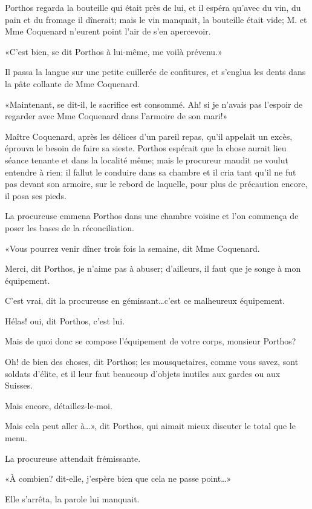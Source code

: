 Porthos regarda la bouteille qui était près de lui, et il espéra qu'avec du vin, du pain et du fromage il dînerait; mais le vin manquait, la bouteille était vide; M. et Mme Coquenard n'eurent point l'air de s'en apercevoir. 

«C'est bien, se dit Porthos à lui-même, me voilà prévenu.» 

Il passa la langue sur une petite cuillerée de confitures, et s'englua les dents dans la pâte collante de Mme Coquenard. 

«Maintenant, se dit-il, le sacrifice est consommé. Ah! si je n'avais pas l'espoir de regarder avec Mme Coquenard dans l'armoire de son mari!» 

Maître Coquenard, après les délices d'un pareil repas, qu'il appelait un excès, éprouva le besoin de faire sa sieste. Porthos espérait que la chose aurait lieu séance tenante et dans la localité même; mais le procureur maudit ne voulut entendre à rien: il fallut le conduire dans sa chambre et il cria tant qu'il ne fut pas devant son armoire, sur le rebord de laquelle, pour plus de précaution encore, il posa ses pieds. 

La procureuse emmena Porthos dans une chambre voisine et l'on commença de poser les bases de la réconciliation. 

«Vous pourrez venir dîner trois fois la semaine, dit Mme Coquenard. 

\speak  Merci, dit Porthos, je n'aime pas à abuser; d'ailleurs, il faut que je songe à mon équipement. 

\speak  C'est vrai, dit la procureuse en gémissant\dots c'est ce malheureux équipement. 

\speak  Hélas! oui, dit Porthos, c'est lui. 

\speak  Mais de quoi donc se compose l'équipement de votre corps, monsieur Porthos? 

\speak  Oh! de bien des choses, dit Porthos; les mousquetaires, comme vous savez, sont soldats d'élite, et il leur faut beaucoup d'objets inutiles aux gardes ou aux Suisses. 

\speak  Mais encore, détaillez-le-moi. 

\speak  Mais cela peut aller à\dots», dit Porthos, qui aimait mieux discuter le total que le menu. 

La procureuse attendait frémissante. 

«À combien? dit-elle, j'espère bien que cela ne passe point\dots» 

Elle s'arrêta, la parole lui manquait. 

